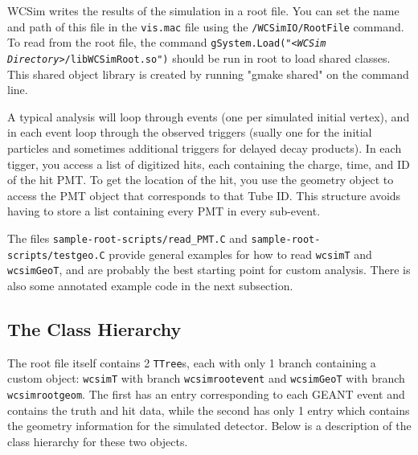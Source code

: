 WCSim writes the results of the simulation in a root file. You can set the name and path of this file in the \texttt{vis.mac} file using the \texttt{/WCSimIO/RootFile} command.  To read from the root file, the command \texttt{gSystem.Load("<\emph{WCSim Directory}>/libWCSimRoot.so")} should be run in root to load shared classes.  This shared object library is created by running "gmake shared" on the command line.

A typical analysis will loop through events (one per simulated initial vertex), and in each event loop through the observed triggers (sually one for the initial particles and sometimes additional triggers for delayed decay products).  In each tigger, you access a list of digitized hits, each containing the charge, time, and ID of the hit PMT.  To get the location of the hit, you use the geometry object to access the PMT object that corresponds to that Tube ID.  This structure avoids having to store a list containing every PMT in every sub-event.

The files \texttt{sample-root-scripts/read\_PMT.C} and \texttt{sample-root-scripts/testgeo.C} provide general examples for how to read \texttt{wcsimT} and \texttt{wcsimGeoT}, and are probably the best starting point for custom analysis.  There is also some annotated example code in the next subsection.


\subsection{The Class Hierarchy}

The root file itself contains 2 \texttt{TTree}s, each with only 1 branch containing a custom object: \texttt{wcsimT} with branch \texttt{wcsimrootevent} and \texttt{wcsimGeoT} with branch \texttt{wcsimrootgeom}.  The first has an entry corresponding to each GEANT event and contains the truth and hit data, while the second has only 1 entry which contains the geometry information for the simulated detector.  Below is a description of the class hierarchy for these two objects.

